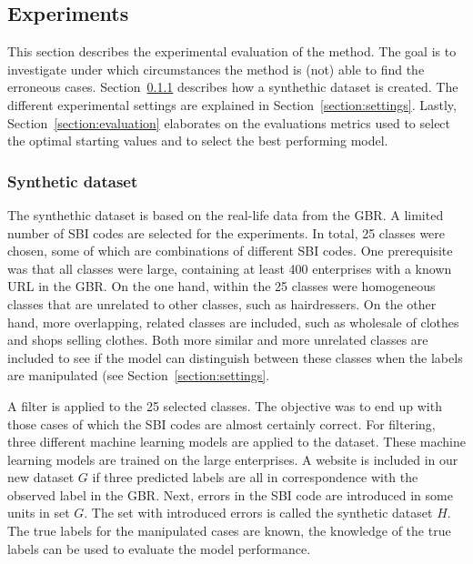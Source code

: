 \documentclass[12pt, a4paper, titlepage]{article}
\begin{document}
							\subsection{Experiments}
							\label{section:experiments}

This section describes the experimental evaluation of the method. The goal is to investigate under which circumstances the method is (not) able to find the erroneous cases. Section~\ref{section:synthdata} describes how a synthethic dataset is created. The different experimental settings are explained in Section~\ref{section:settings}. Lastly, Section~\ref{section:evaluation} elaborates on the evaluations metrics used to select the optimal starting values and to select the best performing model.

					\subsubsection{Synthetic dataset}
					\label{section:synthdata}
The synthethic dataset is based on the real-life data from the GBR. A limited number of SBI codes are selected for the experiments. In total, 25 classes were chosen, some of which are combinations of different SBI codes. One prerequisite was that all classes were large, containing at least 400 enterprises with a known URL in the GBR. On the one hand, within the 25 classes were homogeneous classes that are unrelated to other classes, such as hairdressers. On the other hand, more overlapping, related classes are included, such as wholesale of clothes and shops selling clothes. Both more similar and more unrelated classes are included to see if the model can distinguish between these classes when the labels are manipulated (see Section~\ref{section:settings}.

A filter is applied to the 25 selected classes. The objective was to end up with those cases of which the SBI codes are almost certainly correct. For filtering, three different machine learning models are applied to the dataset. These machine learning models are trained on the large enterprises. A website is included in our new dataset $G$ if three predicted labels are all in correspondence with the observed label in the GBR. Next, errors in the SBI code are introduced in some units in set $G$. The set with introduced errors is called the synthetic dataset $H$. The true labels for the manipulated cases are known, the knowledge of the true labels can be used to evaluate the model performance.
\end{document}
